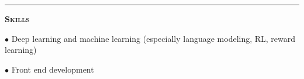 \documentclass[11 pt]{article}
\begin{document}
\begin{comment}

\begin{center}\textbf{The Bishop's School, La Jolla, CA} \end{center} \vspace{-6 pt}

\textbf{Date of graduation}: May 2008, cum laude \hfill \textbf{GPA}: 4.66/5

\begin{small}

$\bullet$ National AP Scholar, 3$\times$ USAMO qualifier \hfill \textbf{ACT}: 34, \textbf{SAT}: 2230\\





\end{small}

\end{comment}
\hrule

\vspace{8 pt}
\begin{center}\begin{Large}\textsc{\textbf{Skills}\\}\end{Large}\end{center}


$\bullet$ Deep learning and machine learning (especially language modeling, RL, reward learning)


$\bullet$ Front end development %
\end{document}
